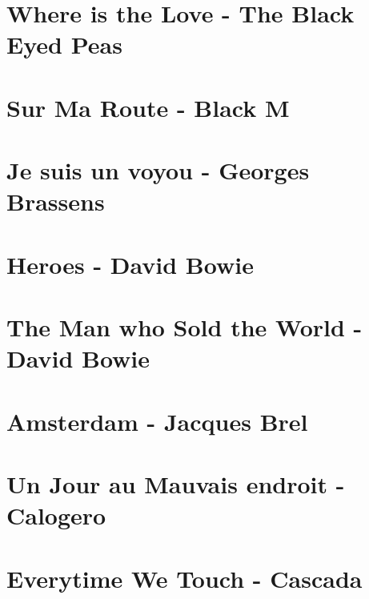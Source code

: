 \documentclass[11pt]{article}
\begin{document}
\section{Where is the Love - The Black Eyed Peas}



\section{Sur Ma Route - Black M}
\begin{guitar}

\end{guitar}

\section{Je suis un voyou - Georges Brassens}
\begin{guitar}

\end{guitar}


\section{Heroes - David Bowie}




\section*{The Man who Sold the World - David Bowie}



\section{Amsterdam - Jacques Brel}



\section{Un Jour au Mauvais endroit - Calogero}
\begin{guitar}

\end{guitar}

\section{Everytime We Touch - Cascada}

\end{document}
